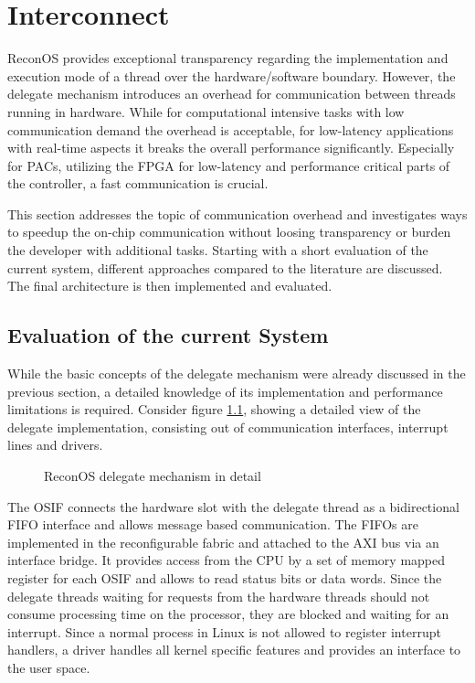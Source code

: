 \chapter{Interconnect}
\label{sec:interconnect}
ReconOS provides exceptional transparency regarding the implementation and
execution mode of a thread over the hardware/software boundary. However, the
delegate mechanism introduces an overhead for communication between threads
running in hardware. While for computational intensive tasks with low
communication demand the overhead is acceptable, for low-latency applications
with real-time aspects it breaks the overall performance significantly.
Especially for \acp{PAC}, utilizing the \ac{FPGA} for low-latency and
performance critical parts of the controller, a fast communication is crucial.

This section addresses the topic of communication overhead and investigates
ways to speedup the on-chip communication without loosing transparency or
burden the developer with additional tasks. Starting with a short evaluation
of the current system, different approaches compared to the literature are
discussed. The final architecture is then implemented and evaluated.

\section{Evaluation of the current System}
While the basic concepts of the delegate mechanism were already discussed in
the previous section, a detailed knowledge of its implementation and
performance limitations is required. Consider figure \ref{fig:delegate},
showing a detailed view of the delegate implementation, consisting out of
communication interfaces, interrupt lines and drivers.
\begin{figure}
	\centering
	\caption{ReconOS delegate mechanism in detail}
	\label{fig:delegate}
\end{figure}
 The \ac{OSIF} connects the hardware slot with the delegate thread as a
bidirectional \ac{FIFO} interface and allows message based communication. The
\acp{FIFO} are implemented in the reconfigurable fabric and attached to the
\ac{AXI} bus via an interface bridge. It provides access from the \ac{CPU} by
a set of memory mapped register for each \ac{OSIF} and allows to read status
bits or data words. Since the delegate threads waiting for requests from the
hardware threads should not consume processing time on the processor, they are
blocked and waiting for an interrupt. Since a  normal process in Linux is not
allowed to register interrupt handlers, a driver handles all kernel specific
features and provides an interface to the user space.

